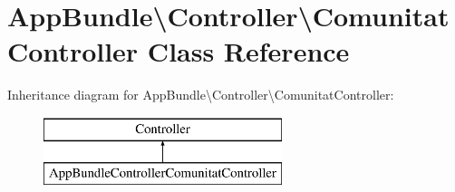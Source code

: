 \hypertarget{class_app_bundle_1_1_controller_1_1_comunitat_controller}{}\section{App\+Bundle\textbackslash{}Controller\textbackslash{}Comunitat\+Controller Class Reference}
\label{class_app_bundle_1_1_controller_1_1_comunitat_controller}
Inheritance diagram for App\+Bundle\textbackslash{}Controller\textbackslash{}Comunitat\+Controller\+:\begin{figure}[H]
\begin{center}
\leavevmode
\includegraphics[height=2.000000cm]{class_app_bundle_1_1_controller_1_1_comunitat_controller}
\end{center}
\end{figure}
